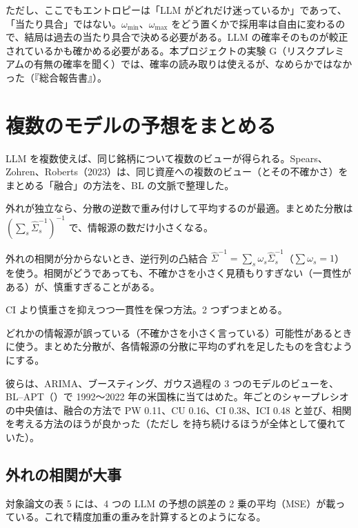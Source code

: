 ただし、ここでもエントロピーは「LLM がどれだけ迷っているか」であって、「当たり具合」ではない。$\omega_{\min}$、$\omega_{\max}$ をどう置くかで採用率は自由に変わるので、結局は過去の当たり具合で決める必要がある。LLM の確率そのものが較正されているかも確かめる必要がある。本プロジェクトの実験 G（リスクプレミアムの有無の確率を聞く）では、確率の読み取りは使えるが、なめらかではなかった（『総合報告書』）。

\section{複数のモデルの予想をまとめる}

LLM を複数使えば、同じ銘柄について複数のビューが得られる。Spears、Zohren、Roberts（2023）は、同じ資産への複数のビュー（とその不確かさ）をまとめる「融合」の方法を、BL の文脈で整理した。

\begin{description}[leftmargin=2em,style=nextline]
\item[精度加重（PW）] 外れが独立なら、分散の逆数で重み付けして平均するのが最適。まとめた分散は $(\sum_s\hat\Sigma_s^{-1})^{-1}$ で、情報源の数だけ小さくなる。
\item[共分散の交差（CI）] 外れの相関が分からないとき、逆行列の凸結合 $\hat\Sigma^{-1}=\sum_s\omega_s\hat\Sigma_s^{-1}$（$\sum\omega_s=1$）を使う。相関がどうであっても、不確かさを小さく見積もりすぎない（一貫性がある）が、慎重すぎることがある。
\item[逆の共分散の交差（ICI）] CI より慎重さを抑えつつ一貫性を保つ方法。2 つずつまとめる。
\item[共分散の和集合（CU）] どれかの情報源が誤っている（不確かさを小さく言っている）可能性があるときに使う。まとめた分散が、各情報源の分散に平均のずれを足したものを含むようにする。
\end{description}

彼らは、ARIMA、ブースティング、ガウス過程の 3 つのモデルのビューを、BL--APT（）で 1992〜2022 年の米国株に当てはめた。年ごとのシャープレシオの中央値は、融合の方法で PW 0.11、CU 0.16、CI 0.38、ICI 0.48 と並び、相関を考える方法のほうが良かった（ただし \SP{} を持ち続けるほうが全体として優れていた）。

\subsection*{外れの相関が大事}

対象論文の表 5 には、4 つの LLM の予想の誤差の 2 乗の平均（MSE）が載っている。これで精度加重の重みを計算するとのようになる。

